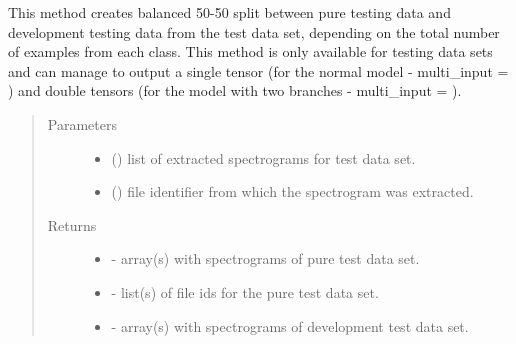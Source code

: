 \documentclass[letterpaper,10pt,english]{sphinxmanual}
\begin{document}
\begin{fulllineitems}
\begin{fulllineitems}
\begin{quote}
\begin{description}
\begin{itemize}
\end{itemize}


\end{description}\end{quote}

\end{fulllineitems}


\begin{fulllineitems}
\label{\detokenize{generate_dataset:generate_dataset.GenerateDataset.pure_development_split}}
This method creates balanced 50-50 split between pure testing data and
development testing data from the test data set, depending on 
the total number of examples from each class. This method is only available
for testing data sets and can manage to output a single tensor (for the normal model - multi\_input = ) and double tensors
(for the model with two branches - multi\_input = ).
\begin{quote}\begin{description}
\item[{Parameters}] \leavevmode\begin{itemize}
\item {} 
 () \textendash{} list of extracted spectrograms for test data set.

\item {} 
 () \textendash{} file identifier from which the spectrogram was extracted.

\end{itemize}

\item[{Returns}] \leavevmode
\begin{itemize}
\item {} 
  - array(s) with spectrograms of pure test data set.

\item {} 
  - list(s) of file ids for the pure test data set.

\item {} 
  - array(s) with spectrograms of development test data set.


\end{itemize}
\end{description}
\end{quote}
\end{fulllineitems}
\end{fulllineitems}
\end{document}
